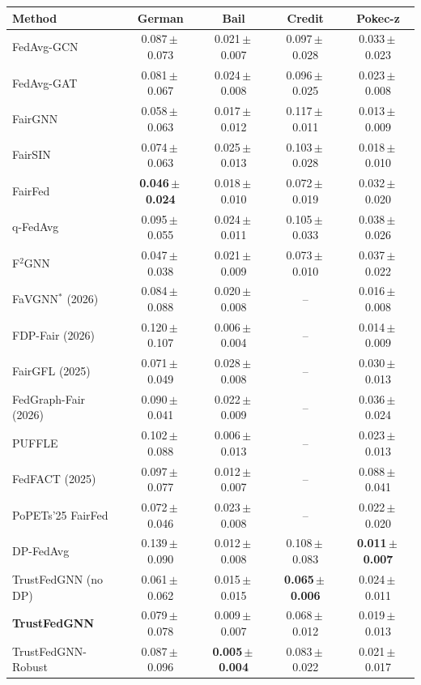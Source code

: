 \begin{tabular}{lcccc}
\toprule
Method & German & Bail & Credit & Pokec-z \\
\midrule
FedAvg-GCN & 0.087\,$\pm$\,0.073 & 0.021\,$\pm$\,0.007 & 0.097\,$\pm$\,0.028 & 0.033\,$\pm$\,0.023 \\
FedAvg-GAT & 0.081\,$\pm$\,0.067 & 0.024\,$\pm$\,0.008 & 0.096\,$\pm$\,0.025 & 0.023\,$\pm$\,0.008 \\
FairGNN & 0.058\,$\pm$\,0.063 & 0.017\,$\pm$\,0.012 & 0.117\,$\pm$\,0.011 & 0.013\,$\pm$\,0.009 \\
FairSIN & 0.074\,$\pm$\,0.063 & 0.025\,$\pm$\,0.013 & 0.103\,$\pm$\,0.028 & 0.018\,$\pm$\,0.010 \\
FairFed & \textbf{0.046\,$\pm$\,0.024} & 0.018\,$\pm$\,0.010 & 0.072\,$\pm$\,0.019 & 0.032\,$\pm$\,0.020 \\
q-FedAvg & 0.095\,$\pm$\,0.055 & 0.024\,$\pm$\,0.011 & 0.105\,$\pm$\,0.033 & 0.038\,$\pm$\,0.026 \\
F$^2$GNN & 0.047\,$\pm$\,0.038 & 0.021\,$\pm$\,0.009 & 0.073\,$\pm$\,0.010 & 0.037\,$\pm$\,0.022 \\
FaVGNN$^{\ast}$ (2026) & 0.084\,$\pm$\,0.088 & 0.020\,$\pm$\,0.008 & -- & 0.016\,$\pm$\,0.008 \\
FDP-Fair (2026) & 0.120\,$\pm$\,0.107 & 0.006\,$\pm$\,0.004 & -- & 0.014\,$\pm$\,0.009 \\
FairGFL (2025) & 0.071\,$\pm$\,0.049 & 0.028\,$\pm$\,0.008 & -- & 0.030\,$\pm$\,0.013 \\
FedGraph-Fair (2026) & 0.090\,$\pm$\,0.041 & 0.022\,$\pm$\,0.009 & -- & 0.036\,$\pm$\,0.024 \\
PUFFLE & 0.102\,$\pm$\,0.088 & 0.006\,$\pm$\,0.013 & -- & 0.023\,$\pm$\,0.013 \\
FedFACT (2025) & 0.097\,$\pm$\,0.077 & 0.012\,$\pm$\,0.007 & -- & 0.088\,$\pm$\,0.041 \\
PoPETs'25 FairFed & 0.072\,$\pm$\,0.046 & 0.023\,$\pm$\,0.008 & -- & 0.022\,$\pm$\,0.020 \\
\midrule
DP-FedAvg & 0.139\,$\pm$\,0.090 & 0.012\,$\pm$\,0.008 & 0.108\,$\pm$\,0.083 & \textbf{0.011\,$\pm$\,0.007} \\
TrustFedGNN (no DP) & 0.061\,$\pm$\,0.062 & 0.015\,$\pm$\,0.015 & \textbf{0.065\,$\pm$\,0.006} & 0.024\,$\pm$\,0.011 \\
\textbf{TrustFedGNN} & 0.079\,$\pm$\,0.078 & 0.009\,$\pm$\,0.007 & 0.068\,$\pm$\,0.012 & 0.019\,$\pm$\,0.013 \\
TrustFedGNN-Robust & 0.087\,$\pm$\,0.096 & \textbf{0.005\,$\pm$\,0.004} & 0.083\,$\pm$\,0.022 & 0.021\,$\pm$\,0.017 \\
\bottomrule
\end{tabular}